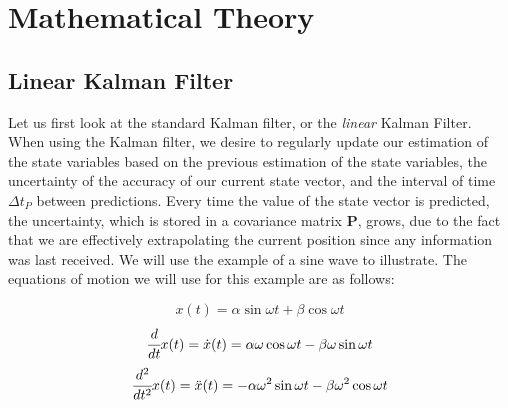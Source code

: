 \documentclass[]{article}
\begin{document}
\section{Mathematical Theory}

\subsection{Linear Kalman Filter}

Let us first look at the standard Kalman filter, or the \textit{linear} Kalman Filter. When using the Kalman filter, we desire to regularly update our estimation of the state variables based on the previous estimation of the state variables, the uncertainty of the accuracy of our current state vector, and the interval of time $\Delta t_{P}$ between predictions. Every time the value of the state vector is predicted, the uncertainty, which is stored in a covariance matrix $\boldsymbol{P}$, grows, due to the fact that we are effectively extrapolating the current position since any information was last received. We will use the example of a sine wave to illustrate. The equations of motion we will use for this example are as follows:

\begin{equation}
x(t) = \alpha\sin{\omega t} + \beta\cos{\omega t}
\label{equ:eom1}
\end{equation}
\begin{equation}
\cfrac{d}{dt} x(t) = \dot{x}(t) = \alpha\omega\cos{\omega t} - \beta\omega\sin{\omega t} \\
\label{equ:eom2}
\end{equation}
\begin{equation}
\cfrac{d^{2}}{dt^{2}} x(t) = \ddot{x}(t) = -\alpha\omega^{2}\sin{\omega t} - \beta\omega^{2}\cos{\omega t} \\
\label{equ:eom3}
\end{equation}
\end{document}

